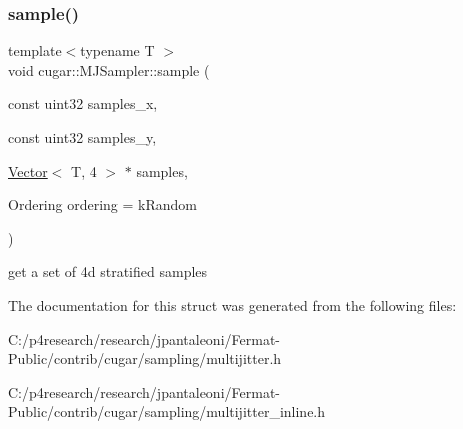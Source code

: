 \subsubsection{\texorpdfstring{sample()}{sample()}\hspace{0.1cm}{\footnotesize\ttfamily [3/3]}}
{\footnotesize\ttfamily template$<$typename T $>$ \\
void cugar\+::\+M\+J\+Sampler\+::sample (\begin{DoxyParamCaption}\item[{const uint32}]{samples\+\_\+x,  }\item[{const uint32}]{samples\+\_\+y,  }\item[{\hyperlink{structcugar_1_1_vector}{Vector}$<$ T, 4 $>$ $\ast$}]{samples,  }\item[{Ordering}]{ordering = {\ttfamily kRandom} }\end{DoxyParamCaption})}

get a set of 4d stratified samples 

The documentation for this struct was generated from the following files\+:\begin{DoxyCompactItemize}
\item 
C\+:/p4research/research/jpantaleoni/\+Fermat-\/\+Public/contrib/cugar/sampling/multijitter.\+h\item 
C\+:/p4research/research/jpantaleoni/\+Fermat-\/\+Public/contrib/cugar/sampling/multijitter\+\_\+inline.\+h\end{DoxyCompactItemize}
